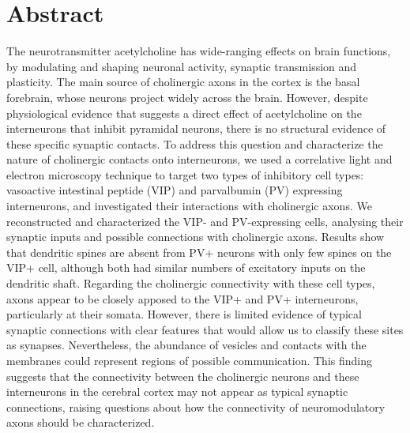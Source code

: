 \chapter*{Abstract}
\label{ch:abstract}
The neurotransmitter acetylcholine has wide-ranging effects on brain functions, by modulating and shaping neuronal activity, synaptic transmission and plasticity. The main source of cholinergic axons in the cortex is the basal forebrain, whose neurons project widely across the brain. However, despite physiological evidence that suggests a direct effect of acetylcholine on the interneurons that inhibit pyramidal neurons, there is no structural evidence of these specific synaptic contacts. To address this question and characterize the nature of cholinergic contacts onto interneurons, we used a correlative light and electron microscopy technique to target two types of inhibitory cell types: vasoactive intestinal peptide (VIP) and parvalbumin (PV) expressing interneurons, and investigated their interactions with cholinergic axons. We reconstructed and characterized the VIP- and PV-expressing cells, analysing their synaptic inputs and possible connections with cholinergic axons. Results show that dendritic spines are absent from PV+ neurons with only few spines on the VIP+ cell, although both had similar numbers of excitatory inputs on the dendritic shaft. Regarding the cholinergic connectivity with these cell types, axons appear to be closely apposed to the VIP+ and PV+ interneurons, particularly at their somata. However, there is limited evidence of typical synaptic connections with clear features that would allow us to classify these sites as synapses. Nevertheless, the abundance of vesicles and contacts with the membranes could represent regions of possible communication. This finding suggests that the connectivity between the cholinergic neurons and these interneurons in the cerebral cortex may not appear as typical synaptic connections, raising questions about how the connectivity of neuromodulatory axons should be characterized.
 
